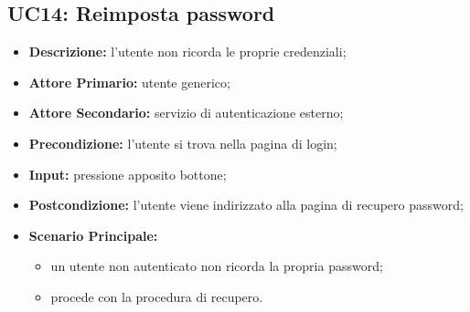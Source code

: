 \subsection{UC14: Reimposta password}
\label{sec:UC14}
\begin{itemize}
    \item \textbf{Descrizione:} l'utente non ricorda le proprie credenziali;
    \item \textbf{Attore Primario:} utente generico;
    \item \textbf{Attore Secondario:} servizio di autenticazione esterno;
    \item \textbf{Precondizione:} l'utente si trova nella pagina di login;
    \item \textbf{Input:} pressione apposito bottone;
    \item \textbf{Postcondizione:} l'utente viene indirizzato alla pagina di recupero password;
    \item \textbf{Scenario Principale:}
          \begin{itemize}
              \item un utente non autenticato non ricorda la propria password;
              \item procede con la procedura di recupero.
          \end{itemize}
\end{itemize}
